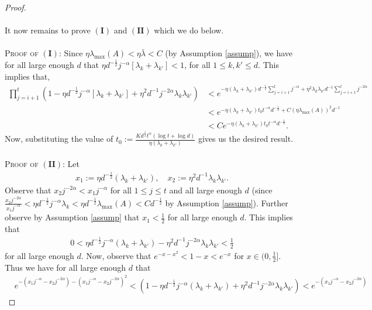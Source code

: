\documentclass[10pt,a4paper]{amsart}
\begin{document}
\begin{proof}
\\\\
It now remains to prove $\mathbf{(I)}$ and $\mathbf{(II)}$ which we do below.
\\\\
\textsc{Proof of $(\mathbf{I})$:} Since $\eta \lambda_{\max}(A) < \eta \bar{\lambda} < C$ (by Assumption \ref{assump}), we have for all large enough $d$ that $\eta d^{-\frac{1}{2}}j^{-\alpha}[\lambda_k + \lambda_{k'}] < 1$, for all $1 \leq k, k' \leq d$. This implies that, 
\begin{align*}
\prod_{j = i+1}^t (1 - \eta d^{-\frac{1}{2}}j^{-\alpha} [\lambda_k + \lambda_{k'}] + \eta^2 d^{-1} j^{-2\alpha} \lambda_{k}\lambda_{k'}) &< e^{-\eta (\lambda_k + \lambda_{k'}) d^{-\frac{1}{2}} \sum_{j = i+1}^t j^{-\alpha} + \eta^2 \lambda_{k} \lambda_{k'}d^{-1} \sum_{j = i+1}^tj^{-2\alpha}} 
\\&< e^{-\eta (\lambda_k + \lambda_{k'})t_0 t^{-\alpha}d^{-\frac{1}{2}} + C(\eta \lambda_{\max}(A))^2d^{-1}}
\\&< Ce^{-\eta (\lambda_k + \lambda_{k'}) t_0 t^{-\alpha} d^{-\frac{1}{2}}}.
\end{align*}
Now, substituting the value of $t_0 := \frac{Kd^{\frac{1}{2}}t^{\alpha} (\log t + \log d)}{\eta (\lambda_k + \lambda_{k'})}$ gives us the desired result.
\\\\
\textsc{Proof of $(\mathbf{II})$:} Let 
\begin{align*}
x_1 := \eta d^{-\frac{1}{2}}(\lambda_k + \lambda_{k'}), \quad x_2 := \eta^2 d^{-1} \lambda_k \lambda_{k'}.
\end{align*}
Observe that $x_2j^{-2\alpha} < x_1j^{-\alpha}$ for all $1 \leq j \leq t$ and all large enough $d$ (since $\frac{x_2j^{-2\alpha}}{x_1j^{-\alpha}} < \eta d^{-\frac{1}{2}} j^{-\alpha} \lambda_k < \eta d^{-\frac{1}{2}} \lambda_{\max}(A) <  Cd^{-\frac{1}{2}}$ by Assumption \ref{assump}). Further observe by Assumption \ref{assump} that $x_1 < \frac{1}{2}$ for all large enough $d$. This implies that
\begin{align*}
0 < \eta d^{-\frac{1}{2}}j^{-\alpha} (\lambda_k + \lambda_{k'}) - \eta^2 d^{-1} j^{-2\alpha}\lambda_{k} \lambda_{k'} < \frac{1}{2}
\end{align*}
for all large enough $d$. Now, observe that $e^{- x - x^2} < 1 - x < e^{-x}$ for $x \in (0, \frac{1}{2}]$. Thus we have for all large enough $d$ that
\begin{align*}
&e^{- (x_1j^{-\alpha} - x_2j^{-2\alpha}) - (x_1j^{-\alpha} - x_2j^{-2\alpha})^2}<  (1 - \eta d^{-\frac{1}{2}}j^{-\alpha} (\lambda_k + \lambda_{k'}) + \eta^2 d^{-1} j^{-2\alpha} \lambda_{k} \lambda_{k'}) < e^{-(x_1j^{-\alpha} - x_2j^{-2\alpha})}

\end{align*}
\end{proof}
\end{document}
